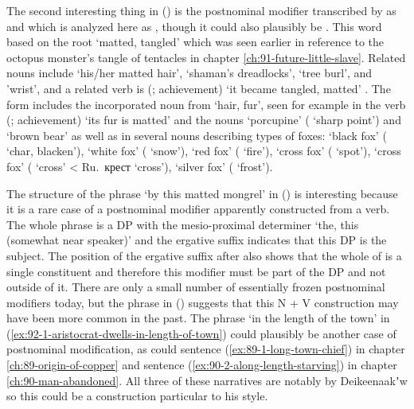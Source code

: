 The second interesting thing in (\lastx) is the postnominal modifier transcribed by \citeauthor{swanton:1909} as  and which is analyzed here as , though it could also plausibly be .
This word based on the root  ‘matted, tangled’ \parencites[f04/47–48]{leer:1973}[748]{leer:1976}[64]{leer:1978b} which was seen earlier in reference to the octopus monster’s tangle of tentacles in chapter \ref{ch:91-future-little-slave}.
Related nouns include
 ‘his/her matted hair’,
 ‘shaman’s dreadlocks’,
 ‘tree burl’,
and  ’wrist’,
and a related verb is
 (; achievement) ‘it became tangled, matted’ \parencite[f04/47–48]{leer:1973}.
The form  includes the incorporated noun  from  ‘hair, fur’, seen for example in the verb  (; achievement) ‘its fur is matted’ and the nouns  ‘porcupine’ ( ‘sharp point’) and  ‘brown bear’ as well as in several nouns describing types of foxes:
 ‘black fox’ ( ‘char, blacken’),
 ‘white fox’ ( ‘snow’),
 ‘red fox’ ( ‘fire’),
 ‘cross fox’ ( ‘spot’),
 ‘cross fox’ ( ‘cross’ < Ru.\ крест  ‘cross’),
 ‘silver fox’ ( ‘frost’).

The structure of the phrase  ‘by this matted mongrel’ in (\lastx) is interesting because it is a rare case of a postnominal modifier apparently constructed from a verb.
The whole phrase is a DP with the mesio-proximal determiner  ‘the, this (somewhat near speaker)’ and the ergative suffix  indicates that this DP is the subject.
The position of the ergative suffix after  also shows that the whole of  is a single constituent and therefore this modifier must be part of the DP and not outside of it.
There are only a small number of essentially frozen postnominal modifiers today, but the phrase in (\lastx) suggests that this N + V construction may have been more common in the past.
The phrase  ‘in the length of the town’ in (\ref{ex:92-1-aristocrat-dwells-in-length-of-town}) could plausibly be another case of postnominal modification, as could sentence (\ref{ex:89-1-long-town-chief}) in chapter \ref{ch:89-origin-of-copper} and sentence (\ref{ex:90-2-along-length-starving}) in chapter \ref{ch:90-man-abandoned}.
All three of these narratives are notably by Deikeenaakʼw so this could be a construction particular to his style.

